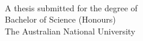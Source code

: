 
\begin{titlepage}
  \enlargethispage{2cm}
  \begin{center}
    \makeatletter
    \Huge\textbf{\@title} \\[.4cm]
    \Huge\textbf{\thesisqualifier} \\[2.5cm]
    \huge\textbf{\@author} \\[9cm]
    \makeatother
    \LARGE A thesis submitted for the degree of \\
    Bachelor of Science (Honours) \\
    The Australian National University \\[2cm]
    \thismonth
  \end{center}
\end{titlepage}
